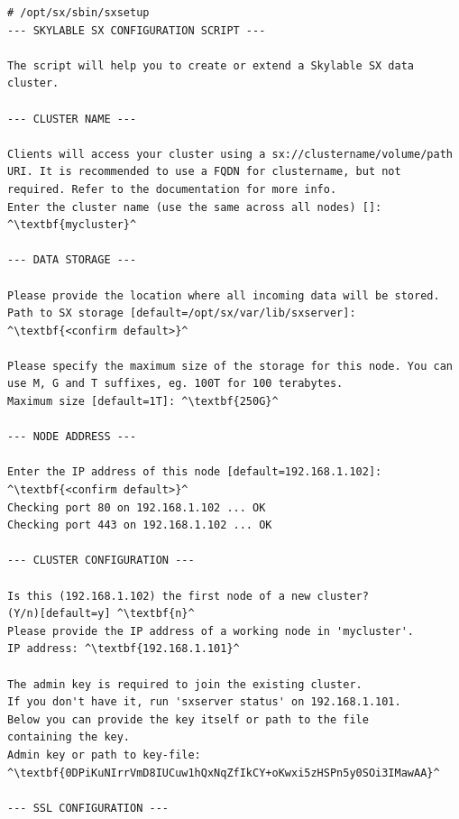 \small
\begin{lstlisting}
# /opt/sx/sbin/sxsetup
--- SKYLABLE SX CONFIGURATION SCRIPT ---

The script will help you to create or extend a Skylable SX data
cluster.

--- CLUSTER NAME ---

Clients will access your cluster using a sx://clustername/volume/path
URI. It is recommended to use a FQDN for clustername, but not
required. Refer to the documentation for more info.
Enter the cluster name (use the same across all nodes) []: ^\textbf{mycluster}^

--- DATA STORAGE ---

Please provide the location where all incoming data will be stored.
Path to SX storage [default=/opt/sx/var/lib/sxserver]: ^\textbf{<confirm default>}^

Please specify the maximum size of the storage for this node. You can
use M, G and T suffixes, eg. 100T for 100 terabytes.
Maximum size [default=1T]: ^\textbf{250G}^

--- NODE ADDRESS ---

Enter the IP address of this node [default=192.168.1.102]:
^\textbf{<confirm default>}^
Checking port 80 on 192.168.1.102 ... OK
Checking port 443 on 192.168.1.102 ... OK

--- CLUSTER CONFIGURATION ---

Is this (192.168.1.102) the first node of a new cluster?
(Y/n)[default=y] ^\textbf{n}^
Please provide the IP address of a working node in 'mycluster'.
IP address: ^\textbf{192.168.1.101}^

The admin key is required to join the existing cluster.
If you don't have it, run 'sxserver status' on 192.168.1.101.
Below you can provide the key itself or path to the file
containing the key.
Admin key or path to key-file:
^\textbf{0DPiKuNIrrVmD8IUCuw1hQxNqZfIkCY+oKwxi5zHSPn5y0SOi3IMawAA}^

--- SSL CONFIGURATION ---


\end{lstlisting}

